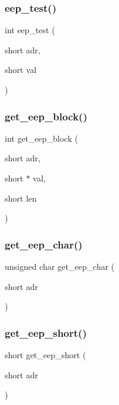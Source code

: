 \subsubsection{eep\+\_\+test()}
{\footnotesize\ttfamily int eep\+\_\+test (\begin{DoxyParamCaption}\item[{short}]{adr,  }\item[{short}]{val }\end{DoxyParamCaption})}

\mbox{\label{eep_8h_a2a7daf404b1670386d98baab1a520c78}} 
\subsubsection{get\+\_\+eep\+\_\+block()}
{\footnotesize\ttfamily int get\+\_\+eep\+\_\+block (\begin{DoxyParamCaption}\item[{short}]{adr,  }\item[{short $\ast$}]{val,  }\item[{short}]{len }\end{DoxyParamCaption})}

\mbox{\label{eep_8h_aa69a2f5dbded5a8882d106efbcb9d8c8}} 
\subsubsection{get\+\_\+eep\+\_\+char()}
{\footnotesize\ttfamily unsigned char get\+\_\+eep\+\_\+char (\begin{DoxyParamCaption}\item[{short}]{adr }\end{DoxyParamCaption})}

\mbox{\label{eep_8h_a24352e40799c2c26aaceb6a3de0f3d6b}} 
\subsubsection{get\+\_\+eep\+\_\+short()}
{\footnotesize\ttfamily short get\+\_\+eep\+\_\+short (\begin{DoxyParamCaption}\item[{short}]{adr }\end{DoxyParamCaption})}

